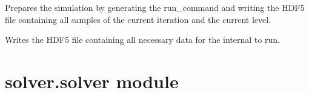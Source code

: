 \documentclass[letterpaper,10pt,english]{sphinxmanual}
\begin{document}
\begin{fulllineitems}

\begin{fulllineitems}
\label{\detokenize{solver:solver.internal.Internal.h5write}}
\end{fulllineitems}


\begin{fulllineitems}
\label{\detokenize{solver:solver.internal.Internal.prepare}}
Prepares the simulation by generating the run\_command 
and writing the HDF5 file containing all samples of the current 
iteration and the current level.

\end{fulllineitems}


\begin{fulllineitems}
\label{\detokenize{solver:solver.internal.Internal.write_hdf5}}
Writes the HDF5 file containing all necessary data for the 
internal to run.

\end{fulllineitems}


\end{fulllineitems}



\section{solver.solver module}
\label{\detokenize{solver:module-solver.solver}}\label{\detokenize{solver:solver-solver-module}}
\end{document}
